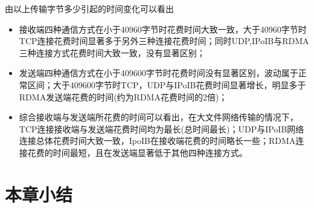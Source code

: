 {由以上传输字节多少引起的时间变化可以看出
\begin{itemize}
    \item 接收端四种通信方式在小于40960字节时花费时间大致一致，大于40960字节时TCP连接花费时间显著多于另外三种连接花费时间；同时UDP,IPoIB与RDMA三种连接方式花费时间大致一致，没有显著区别；
    \item 发送端四种通信方式在小于409600字节时花费时间没有显著区别，波动属于正常区间；大于409600字节时TCP，UDP与IPoIB花费时间显著增长，明显多于RDMA发送端花费的时间(约为RDMA花费时间的2倍)；
    \item 综合接收端与发送端所花费的时间可以看出，在大文件网络传输的情况下，TCP连接接收端与发送端花费时间均为最长(总时间最长)；UDP与IPoIB网络连接总体花费时间大致一致，IpoIB在接收端花费的时间略长一些；RDMA连接花费的时间最短，且在发送端显著低于其他四种连接方式。
\end{itemize}

\section{本章小结}
}